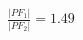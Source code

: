 \documentclass[preview]{standalone}
\begin{document}
\begin{align*}
\frac{|PF_1|}{|PF_2|} = 1.49
\end{align*}
\end{document}
